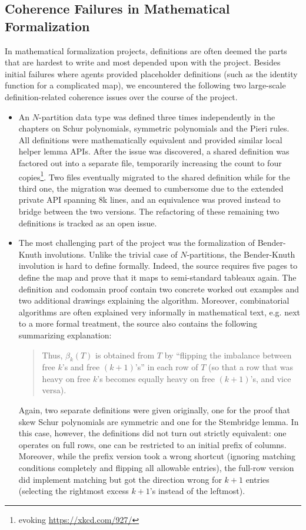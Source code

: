 \documentclass[]{fairmeta}
\begin{document}
\subsection{Coherence Failures in Mathematical Formalization}
In mathematical formalization projects, definitions are often deemed the parts that are hardest to write and most depended upon with the project. Besides initial failures where agents provided placeholder definitions (such as the identity function for a complicated map), we encountered the following two large-scale definition-related coherence issues over the course of the project.
\begin{itemize}
\item An $N$-partition data type was defined three times independently in the chapters on Schur polynomials, symmetric polynomials and the Pieri rules. All definitions were mathematically equivalent and provided similar local helper lemma APIs. After the issue was discovered, a shared definition was factored out into a separate file, temporarily increasing the count to four copies\footnote{evoking \url{https://xkcd.com/927/}}. Two files eventually migrated to the shared definition while for the third one, the migration was deemed to cumbersome due to the extended private API spanning 8k lines, and an equivalence was proved instead to bridge between the two versions. The refactoring of these remaining two definitions is tracked as an open issue. 
\item The most challenging part of the project was the formalization of Bender-Knuth involutions. Unlike the trivial case of $N$-partitions, the Bender-Knuth involution is hard to define formally. Indeed, the source requires five pages to define the map and prove that it maps to semi-standard tableaux again. The definition and codomain proof contain two concrete worked out examples and two additional drawings explaining the algorithm. Moreover, combinatorial algorithms are often explained very informally in mathematical text, e.g. next to a more formal treatment, the source also contains the following summarizing explanation:
\begin{quote}
Thus, $\beta_k(T)$ is obtained from $T$ by ``flipping the imbalance between free $k$'s and free $(k+1)$'s'' in each row of $T$ (so that a row that was heavy on free $k$'s becomes equally heavy on free $(k+1)$'s, and vice versa).
\end{quote}
Again, two separate definitions were given originally, one for the proof that skew Schur polynomials are symmetric and one for the Stembridge lemma. In this case, however, the definitions did not turn out strictly equivalent: one operates on full rows, one can be restricted to an initial prefix of columns. Moreover, while the prefix version took a wrong shortcut (ignoring matching conditions completely and flipping all allowable entries), the full-row version did implement matching but got the direction wrong for $k+1$ entries (selecting the rightmost excess $k+1$'s instead of the leftmost).


\end{itemize}
\end{document}
